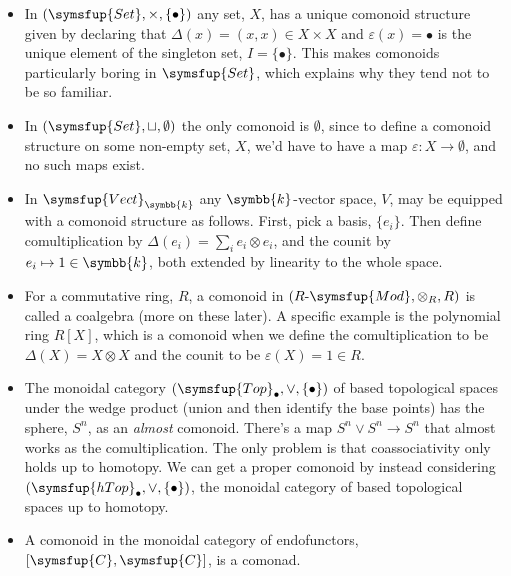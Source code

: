 \documentclass[fleqn]{NotesClass}
\makeatletter
\newcommand{\cat}[1]{\symsfup{#1}}
\newcommand{\c@egory}[1]{\symsfup{#1}}
\newcommand{\Set}{\c@egory{Set}}
\newcommand{\Vect}[1][\field]{\c@egory{Vect}_{#1}}
\newcommand{\RMod}[1][R]{#1\text{-}\c@egory{Mod}}
\newcommand{\TopPt}{\c@egory{Top}_{\bullet}}
\newcommand{\hTopPt}{\c@egory{hTop}_{\bullet}}
\renewcommand{\field}{\symbb{k}}
\makeatother
\begin{document}
    \begin{exm}{}{}
        \begin{itemize}
            \item In \((\Set, \times, \{\bullet\})\) any set, \(X\), has a unique comonoid structure given by declaring that \(\Delta(x) = (x, x) \in X \times X\) and \(\varepsilon(x) = \bullet\) is the unique element of the singleton set, \(I = \{\bullet\}\).
            This makes comonoids particularly boring in \(\Set\), which explains why they tend not to be so familiar.
            \item In \((\Set, \sqcup, \emptyset)\) the only comonoid is \(\emptyset\), since to define a comonoid structure on some non-empty set, \(X\), we'd have to have a map \(\varepsilon \colon X \to \emptyset\), and no such maps exist.
            \item In \(\Vect\) any \(\field\)-vector space, \(V\), may be equipped with a comonoid structure as follows.
            First, pick a basis, \(\{e_i\}\).
            Then define comultiplication by \(\Delta(e_i) = \sum_i e_i \otimes e_i\), and the counit by \(e_i \mapsto 1 \in \field\), both extended by linearity to the whole space.
            \item For a commutative ring, \(R\), a comonoid in \((\RMod, \otimes_R, R)\) is called a coalgebra (more on these later).
            A specific example is the polynomial ring \(R[X]\), which is a comonoid when we define the comultiplication to be \(\Delta(X) = X \otimes X\) and the counit to be \(\varepsilon(X) = 1 \in R\).
            \item The monoidal category \((\TopPt, \vee, \{\bullet\})\) of based topological spaces under the wedge product (union and then identify the base points) has the sphere, \(S^n\), as an \emph{almost} comonoid.
            There's a map \(S^n \vee S^n \to S^n\) that almost works as the comultiplication.
            The only problem is that coassociativity only holds up to homotopy.
            We can get a proper comonoid by instead considering \((\hTopPt, \vee, \{\bullet\})\), the monoidal category of based topological spaces up to homotopy.
            \item A comonoid in the monoidal category of endofunctors, \([\cat{C}, \cat{C}]\), is a comonad.
        \end{itemize}
    \end{exm}
    
    
    
    \backmatter
    \renewcommand{\glossaryname}{Acronyms}
    \printglossary[acronym]
    \printindex
\end{document}
